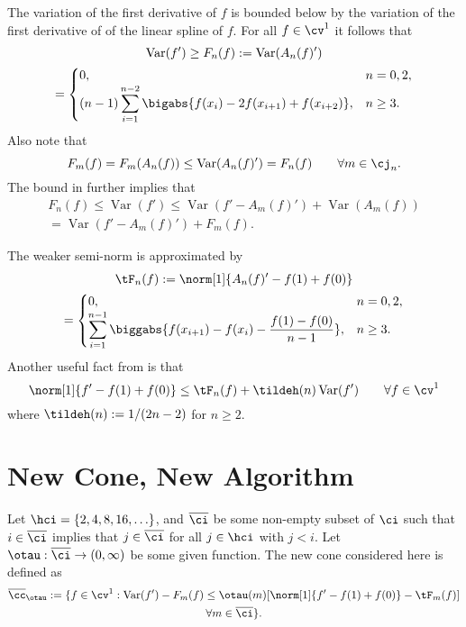 \documentclass[]{elsarticle}
\DeclareMathOperator{\Var}{Var}
\newcommand{\occ}{\overline{\cc}}
\newcommand{\oci}{\overline{\ci}}
\theoremstyle{definition}
\theoremstyle{remark}
\begin{document}
The variation of the first derivative of $f$ is bounded below by the variation of the first derivative of of the linear spline of $f$.  For all $f \in \cv^1$ it follows that
\begin{multline} 
\Var(f') \ge F_n(f) :=\Var(A_n(f)') \\
 = \begin{cases} 0, & n=0,2, \\
\displaystyle (n-1)\sum_{i=1}^{n-2} \bigabs{f(x_{i}) - 2 f(x_{i+1})+f(x_{i+2})}, 
& n\ge 3. 
\end{cases}
\label{Fnormalg}
\end{multline}
Also note that
\begin{equation} \label{Fnbounda}
F_m(f) = F_m(A_n(f)) \le \Var(A_n(f)') = F_n(f) \qquad \forall m \in \cj_n.
\end{equation}
The bound in  further implies that 
\begin{multline} \label{Fnboundb}
F_n(f) \le \Var(f')  \le \Var(f'-A_m(f)') + \Var(A_m(f)) \\
= \Var(f'-A_m(f)') + F_m(f).
\end{multline}

The weaker semi-norm is approximated by 
\begin{multline} \label{tFnorm}
\tF_n(f) :=\norm[1]{A_n(f)'-f(1)+f(0)} \\
 = \begin{cases} 0, & n=0,2, \\
\displaystyle \sum_{i=1}^{n-1} \biggabs{f(x_{i+1}) - f(x_{i}) -\frac{f(1)-f(0)}{n-1}}, 
& n\ge 3. 
\end{cases}
\end{multline}
Another useful fact from \cite[Sect.\ 5.1]{HicEtal14b} is that 
\begin{equation} \label{boundweaknorm}
\norm[1]{f'-f(1)+f(0)} \le \tF_n(f) + \tildeh(n) \Var(f') \qquad \forall f \in \cv^1 
\end{equation}
where $\tildeh(n):=1/(2n-2)$ for $n\ge 2$.


\section{New Cone, New Algorithm}
Let $\hci=\{2, 4, 8, 16, \ldots\}$, and $\oci$ be some non-empty subset of $\ci$ such that $i \in \oci$ implies that $j \in \oci$ for all $j \in \hci$ with $j < i$.  Let $\otau:\oci \to (0,\infty)$ be some given function.   The new cone considered here is defined as
\begin{multline} \label{Fcone}
\occ_{\otau}:= \{ f \in \cv^1 :  \Var(f') - F_m(f) \le \otau(m) [\norm[1]{f' - f(1)+f(0)}- \tF_m(f)] \\ \forall m \in \oci \}.
\end{multline}
\end{document}
